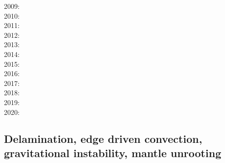 {2009: \cite{bupb09}\cite{plmg09}\cite{rigo09}\cite{bubg09}\cite{coco09}\\
2010: \cite{hamo10}\cite{fasm10}\cite{grpy10}\cite{vago10}\cite{plmf10}\cite{spgs10a}\cite{pygp10}
      \cite{jabw10}\\
2011: \cite{rera11}\cite{chss11}\\
2012: \cite{wagw12}\cite{vacl12}\cite{buit12}\cite{kogp12}\cite{gohg12}\cite{trub12}\\
2013: \cite{wazh13}\cite{krcu13}\cite{frbm13}\cite{wagw13}\cite{duyp13}\cite{rugb13}
      \cite{scdg13}\\
2014: \cite{kava14}\cite{dusp14}\cite{wavp14}\cite{whbb14}\cite{scml14}
      \cite{mals14}\cite{gupm14}\cite{gahs14}\cite{mutg14}\\
2015: \cite{wavp15}\cite{thkp15}\cite{mags15}\cite{duys15}\cite{dusp15}\\
2016: \cite{wahz16}\\
2017: \cite{rugb17}\cite{ozgw17}\cite{vomc17}\cite{taac17}\cite{ithc17}\\
2018: \cite{wavp18}\cite{nigw18}\cite{bemc18}\cite{neew18}\\
2019: \cite{koen19}\cite{kipd19}\cite{crcm19}\cite{pedm19}\cite{mazz19}\cite{chch19}\\
2020: \cite{yamq20}
}

\subsection{Delamination, edge driven convection, gravitational instability, mantle unrooting} 

{\scriptsize
\noindent
\cite{kian95}
\cite{homo97}
\cite{kian98}\cite{scsc98}\cite{mafs98}
\cite{kiri00}\cite{scys00}
\cite{modo04}
\cite{elki07}
\cite{vanv08}
\cite{gopy08}\cite{vavg08}
\cite{vabv10}
\cite{lesm11}\cite{vanj11}
\cite{krcu13}\cite{sths13}
\cite{baeg14}\cite{kava14}
\cite{wahz15}
\cite{bems17}
\cite{peka18}
}

